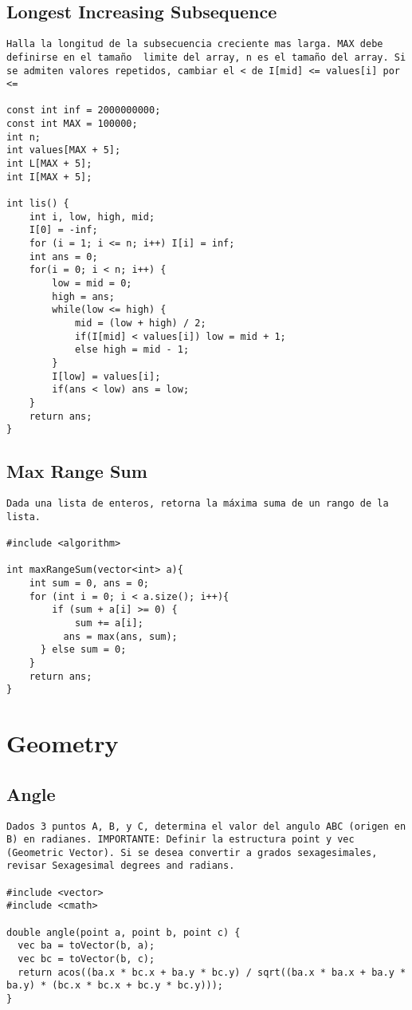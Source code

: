 \documentclass[10pt,letterpaper,twocolumn,twosided]{article}
\begin{document}
\subsection{Longest Increasing Subsequence}
\begin{lstlisting}
Halla la longitud de la subsecuencia creciente mas larga. MAX debe definirse en el tamaño  limite del array, n es el tamaño del array. Si se admiten valores repetidos, cambiar el < de I[mid] <= values[i] por <=

const int inf = 2000000000;
const int MAX = 100000;
int n; 
int values[MAX + 5];
int L[MAX + 5]; 
int I[MAX + 5]; 

int lis() { 
 	int i, low, high, mid;
 	I[0] = -inf; 
 	for (i = 1; i <= n; i++) I[i] = inf;
 	int ans = 0;
 	for(i = 0; i < n; i++) {
 		low = mid = 0;
 		high = ans;
 		while(low <= high) {
 			mid = (low + high) / 2;
 			if(I[mid] < values[i]) low = mid + 1;
 			else high = mid - 1;
 		} 
 		I[low] = values[i];
 		if(ans < low) ans = low;
	}
 	return ans;
}
\end{lstlisting}

\subsection{Max Range Sum}
\begin{lstlisting}
Dada una lista de enteros, retorna la máxima suma de un rango de la lista.

#include <algorithm>

int maxRangeSum(vector<int> a){
	int sum = 0, ans = 0;
	for (int i = 0; i < a.size(); i++){
		if (sum + a[i] >= 0) {  
			sum += a[i];
		  ans = max(ans, sum);          
	  } else sum = 0;
	}
	return ans;
}
\end{lstlisting}

\section{Geometry}

\subsection{Angle}
\begin{lstlisting}
Dados 3 puntos A, B, y C, determina el valor del angulo ABC (origen en B) en radianes. IMPORTANTE: Definir la estructura point y vec (Geometric Vector). Si se desea convertir a grados sexagesimales, revisar Sexagesimal degrees and radians.

#include <vector>
#include <cmath>

double angle(point a, point b, point c) { 
  vec ba = toVector(b, a);
  vec bc = toVector(b, c);
  return acos((ba.x * bc.x + ba.y * bc.y) / sqrt((ba.x * ba.x + ba.y * ba.y) * (bc.x * bc.x + bc.y * bc.y))); 
}
\end{lstlisting}
\end{document}
